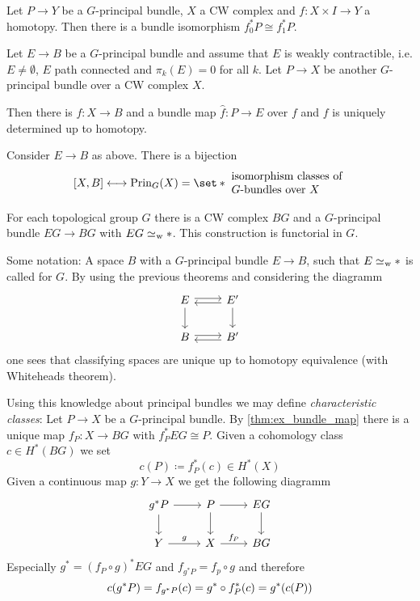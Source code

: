 \begin{theorem}[{name={homotopy invariance}}]
	Let $P \to Y$ be a $G$-principal bundle, $X$ a CW complex and $f \colon X \times I \to Y$ a homotopy.
	Then there is a bundle isomorphism $f_0^* P \cong f_1^* P$.
\end{theorem}

\begin{theorem}[label=thm:ex_bundle_map]
	Let $E \to B$ be a $G$-principal bundle and assume that $E$ is weakly contractible, i.e. $E \neq \emptyset$, $E$ path connected and $\pi_k(E)=0$ for all $k$.
	Let $P \to X$ be another $G$-principal bundle over a CW complex $X$.
	
	Then there is $f \colon X \to B$ and a bundle map $\hat{f} \colon P \to E$ over $f$ and $f$ is uniquely determined up to homotopy.
\end{theorem}


\begin{corollary}
	Consider $E \to B$ as above.
	There is a bijection
	\[
		\benbrace*{X,B} \longleftrightarrow \operatorname{Prin}_G(X) = \set*{\!\begin{array}{ll}
			\text{isomorphism classes of}\\
			\text{$G$-bundles over $X$}
		\end{array}\!}
	\]
\end{corollary}

\begin{theorem}
	For each topological group $G$ there is a CW complex $BG$ and a $G$-principal bundle $EG \to BG$ with $EG \simeq_{\mkern1mu\mathrm{w}} *$.
	This construction is functorial in $G$.
\end{theorem}

Some notation: A space $B$ with a $G$-principal bundle $E \to B$, such that $E \simeq_{\mkern1mu\mathrm{w}} *$ is called  for $G$.
By using the previous theorems and considering the diagramm
\[
	\begin{tikzcd}
		E \rar[yshift=2pt] \dar & E' \lar[yshift=-2pt] \dar \\
		B \rar[yshift=2pt] & B' \lar[yshift=-2pt]
	\end{tikzcd}
\]
one sees that classifying spaces are unique up to homotopy equivalence (with Whiteheads theorem).

Using this knowledge about principal bundles we may define \emph{characteristic classes}:
Let $P \to X$ be a $G$-principal bundle. 
By \autoref{thm:ex_bundle_map} there is a unique map $f_P \colon X \to BG$ with $f_P^* EG \cong P$.
Given a cohomology class $c \in H^*(BG)$ we set
\[
	c(P) \coloneqq f_P^*(c) \in H^*(X)
\]
Given a continuous map $g \colon Y \to X$ we get the following diagramm
\[
	\begin{tikzcd}
		g^* P \rar \dar & P \dar \rar &  EG \dar \\
		Y \rar["g"] & X \rar["f_P"] & BG
	\end{tikzcd}
\]
Especially $g^* = (f_P \circ g)^* EG$ and $f_{g^*P} = f_p \circ g$ and therefore
\[
	c \enbrace*{g^* P} = f_{g^*P}(c) = g^* \circ f_P^*(c) = g^* \enbrace*{c(P)}
\]

